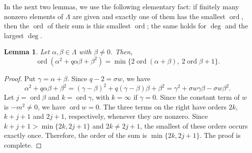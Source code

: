 \documentclass[11pt,reqno,a4paper]{amsart}
\numberwithin{equation}{section}
\newtheorem{lemma}[theorem]{Lemma}
\theoremstyle{definition}
\theoremstyle{plain}
\newcommand{\ord}{\operatorname{ord}}
\begin{document}
In the next two lemmas, we use the following elementary fact: if finitely many nonzero elements of $\Lambda$ are given and exactly one of them has the smallest $\ord$, then the $\ord$ of their sum is this smallest $\ord$; the same holds for $\deg$ and the largest $\deg$.

\begin{lemma}
Let $\alpha,\beta\in\Lambda$ with $\beta\ne0$. Then,
\[
\ord(\alpha^2+q\alpha\beta+\beta^2)=\min\{2\ord(\alpha+\beta),\ 2\ord\beta+1\}.
\]
\end{lemma}
\begin{proof}
Put $\gamma=\alpha+\beta$. Since $q-2=\sigma w$, we have
\[
\alpha^2+q\alpha\beta+\beta^2=(\gamma-\beta)^2+q(\gamma-\beta)\beta+\beta^2
=\gamma^2+\sigma w\gamma\beta-\sigma w\beta^2.
\]
Let $j=\ord\beta$ and $k=\ord\gamma$, with $k=\infty$ if $\gamma=0$. Since the constant term of $w$ is $-m^2\ne0$, we have $\ord w=0$. The three terms on the right have orders $2k$, $k+j+1$ and $2j+1$, respectively, whenever they are nonzero. Since $k+j+1>\min\{2k,2j+1\}$ and $2k\ne2j+1$, the smallest of these orders occurs exactly once. Therefore, the order of the sum is $\min\{2k,2j+1\}$. The proof is complete.
\end{proof}
\end{document}
